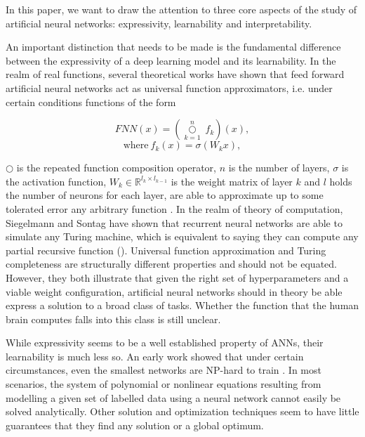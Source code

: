\documentclass{article}
\begin{document}
In this paper, we want to draw the attention to three core aspects of the study of artificial neural networks: expressivity, learnability and interpretability.

An important distinction that needs to be made is the fundamental difference between the expressivity of a deep learning model and its learnability. In the realm of real functions, several theoretical works have shown that feed forward artificial neural networks act as universal function approximators, i.e. under certain conditions functions of the form



$$
FNN(x) = (\overset{n}{\underset{k=1}\bigcirc}\ f_k)(x),
$$
$$
\text{where} \  f_k(x) = \sigma(W_k x),
$$


$\bigcirc$ is the repeated function composition operator, $n$ is the number of layers, $\sigma$ is the activation function, $W_k \in \mathbb{R}^{l_k \times l_{k-1}}$ is the weight matrix of layer $k$ and $l$ holds the number of neurons for each layer, are able to approximate up to some tolerated error any arbitrary function \cite{cybenko1, hornik1989multilayer, hornik1991approximation}. In the realm of theory of computation, Siegelmann and Sontag have shown that recurrent neural networks are able to simulate any Turing machine, which is equivalent to saying they can compute any partial recursive function (\citeyear{siegelmann1995computational}). Universal function approximation and Turing completeness are structurally different properties and should not be equated. However, they both illustrate that given the right set of hyperparameters and a viable weight configuration, artificial neural networks should in theory be able express a solution to a broad class of tasks. Whether the function that the human brain computes falls into this class is still unclear.

While expressivity seems to be a well established property of ANNs, their learnability is much less so. An early work showed that under certain circumstances, even the smallest networks are NP-hard to train 
\cite{blum1989training}. In most scenarios, the system of polynomial or nonlinear equations resulting from modelling a given set of labelled data using a neural network cannot easily be solved analytically. Other solution and optimization techniques seem to have little guarantees that they find any solution or a global optimum. %
\end{document}
